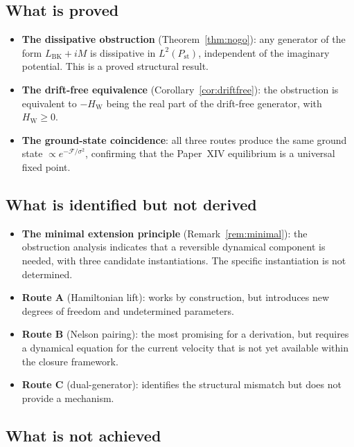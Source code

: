 \documentclass[12pt]{article}
\newcommand{\Fcal}{\mathcal{F}}
\begin{document}
\subsection{What is proved}

\begin{itemize}
    \item \textbf{The dissipative obstruction} (Theorem~\ref{thm:nogo}): any generator of the form $L_{\mathrm{BK}} + iM$ is dissipative in $L^2(P_{\mathrm{st}})$, independent of the imaginary potential. This is a proved structural result.
    \item \textbf{The drift-free equivalence} (Corollary~\ref{cor:driftfree}): the obstruction is equivalent to $-H_{\mathrm{W}}$ being the real part of the drift-free generator, with $H_{\mathrm{W}} \geq 0$.
    \item \textbf{The ground-state coincidence}: all three routes produce the same ground state $\propto e^{-\Fcal/\sigma^2}$, confirming that the Paper~XIV equilibrium is a universal fixed point.
\end{itemize}

\subsection{What is identified but not derived}

\begin{itemize}
    \item \textbf{The minimal extension principle} (Remark~\ref{rem:minimal}): the obstruction analysis indicates that a reversible dynamical component is needed, with three candidate instantiations. The specific instantiation is not determined.
    \item \textbf{Route A} (Hamiltonian lift): works by construction, but introduces new degrees of freedom and undetermined parameters.
    \item \textbf{Route B} (Nelson pairing): the most promising for a derivation, but requires a dynamical equation for the current velocity that is not yet available within the closure framework.
    \item \textbf{Route C} (dual-generator): identifies the structural mismatch but does not provide a mechanism.
\end{itemize}

\subsection{What is not achieved}
\end{document}
